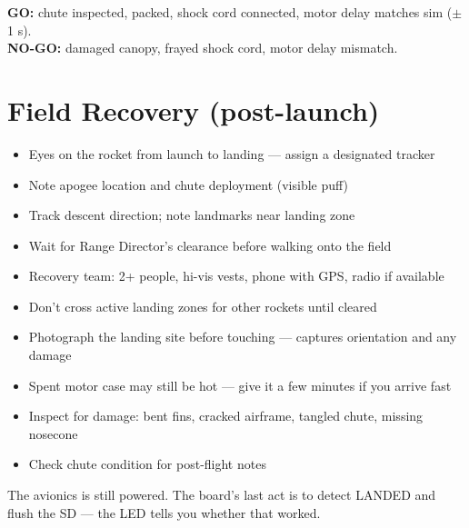 \documentclass[11pt,a4paper,oneside]{report}
\begin{document}
\begin{gobox}
\textbf{GO:} chute inspected, packed, shock cord connected, motor delay matches sim ($\pm$1 s). \\[4pt]
\textbf{NO-GO:} damaged canopy, frayed shock cord, motor delay mismatch.
\end{gobox}

\section{Field Recovery (post-launch)}

\begin{itemize}
  \item Eyes on the rocket from launch to landing --- assign a designated tracker
  \item Note apogee location and chute deployment (visible puff)
  \item Track descent direction; note landmarks near landing zone
  \item Wait for Range Director's clearance before walking onto the field
\end{itemize}

\begin{itemize}
  \item Recovery team: 2+ people, hi-vis vests, phone with GPS, radio if available
  \item Don't cross active landing zones for other rockets until cleared
  \item Photograph the landing site before touching --- captures orientation and any damage
\end{itemize}

\begin{itemize}
  \item Spent motor case may still be hot --- give it a few minutes if you arrive fast
  \item Inspect for damage: bent fins, cracked airframe, tangled chute, missing nosecone
  \item Check chute condition for post-flight notes
\end{itemize}


The avionics is still powered. The board's last act is to detect LANDED and flush the SD --- the LED tells you whether that worked.
\end{document}
